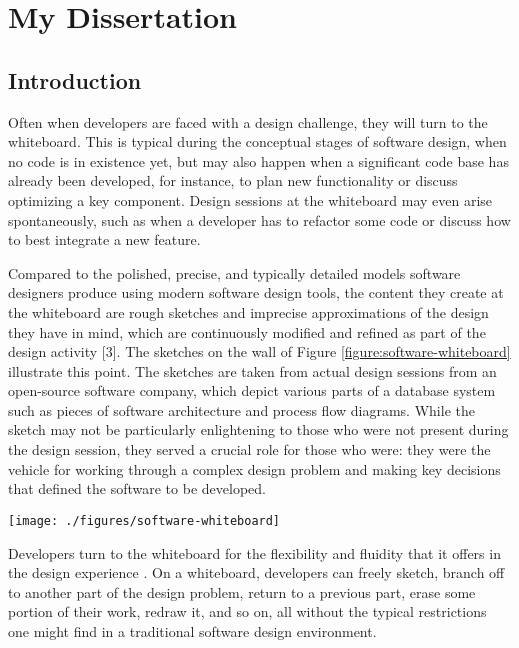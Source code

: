 \chapter{My Dissertation}
\label{chapter:introduction}

\section{Introduction}

Often when developers are faced with a design challenge, they will turn to the whiteboard.  This is typical during the conceptual stages of software design, when no code is in existence yet, but may also happen when a significant code base has already been developed, for instance, to plan new functionality or discuss optimizing a key component. Design sessions at the whiteboard may even arise spontaneously, such as when a developer has to refactor some code or discuss how to best integrate a new feature.

Compared to the polished, precise, and typically detailed models software designers produce using modern software design tools, the content they create at the whiteboard are rough sketches and imprecise approximations of the design they have in mind, which are continuously modified and refined as part of the design activity [3]. The sketches on the wall of Figure \ref{figure:software-whiteboard} illustrate this point. The sketches are taken from actual design sessions from an open-source software company, which depict various parts of a database system such as pieces of software architecture and process flow diagrams. While the sketch may not be particularly enlightening to those who were not present during the design session, they served a crucial role for those who were: they were the vehicle for working through a complex design problem and making key decisions that defined the software to be developed.

\begin{figure*}[tbh]
  \centering
  \texttt{[image: ./figures/software-whiteboard]}
  \caption{Example sketches taken from actual design sessions}
  \label{figure:software-whiteboard}
\end{figure*}

Developers turn to the whiteboard for the flexibility and fluidity that it offers in the design experience \cite{cherubini2007let}. On a whiteboard, developers can freely sketch, branch off to another part of the design problem, return to a previous part, erase some portion of their work, redraw it, and so on, all without the typical restrictions one might find in a traditional software design environment. 

